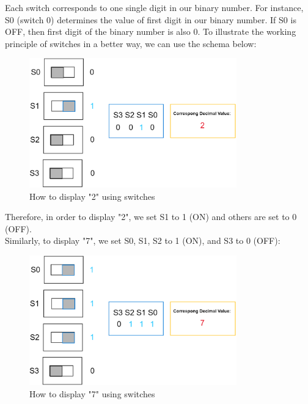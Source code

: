 \documentclass[pdftex,12pt,a4paper]{article}
\begin{document}
\begin{itemize}
\begin{itemize}
\begin{figure}[H]
   \end{figure}
   
   Each switch corresponds to one single digit in our binary number. For instance, S0 (switch 0) determines the value of first digit in our binary number. If S0 is OFF, then first digit of the binary number is also 0. To illustrate the working principle of switches in a better way, we can use the schema below:
   \begin{figure}[H]
    \centering
        \includegraphics[width=0.8\textwidth]{display2.png}	
        \caption{How to display "2" using switches}
        
   \end{figure}
   Therefore, in order to display "2", we set S1 to 1 (ON) and others are set to 0 (OFF).\\

   Similarly, to display "7", we set S0, S1, S2 to 1 (ON), and S3 to 0 (OFF):
   \begin{figure}[H]
    \centering
        \includegraphics[width=0.8\textwidth]{display7.png}	
        \caption{How to display "7" using switches}
        
   \end{figure}


\end{itemize}
\end{itemize}
\end{document}
